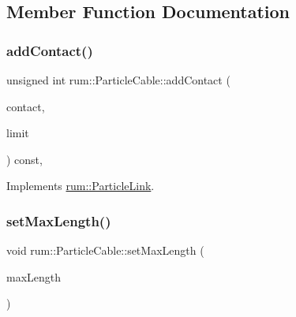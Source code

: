 \subsection{Member Function Documentation}
\mbox{\label{classrum_1_1_particle_cable_a078344be0db7ccc00d326ac767736431}} 
\subsubsection{\texorpdfstring{add\+Contact()}{addContact()}}
{\footnotesize\ttfamily unsigned int rum\+::\+Particle\+Cable\+::add\+Contact (\begin{DoxyParamCaption}\item[{\mbox{\hyperlink{classrum_1_1_particle_contact}{Particle\+Contact}} $\ast$}]{contact,  }\item[{unsigned int}]{limit }\end{DoxyParamCaption}) const\hspace{0.3cm}{\ttfamily [override]}, {\ttfamily [virtual]}}



Implements \mbox{\hyperlink{classrum_1_1_particle_link_a0da76619bd1d2ae04d5f8173c2883ff2}{rum\+::\+Particle\+Link}}.

\mbox{\label{classrum_1_1_particle_cable_a3a40cd1d2581bec38d66275af22c9347}} 
\subsubsection{\texorpdfstring{set\+Max\+Length()}{setMaxLength()}}
{\footnotesize\ttfamily void rum\+::\+Particle\+Cable\+::set\+Max\+Length (\begin{DoxyParamCaption}\item[{\mbox{\hyperlink{namespacerum_a7e8cca23573d5eaead0f138cbaa4862c}{real}}}]{max\+Length }\end{DoxyParamCaption})}

\mbox{\label{classrum_1_1_particle_cable_ab6b2076bdb4bd5ab15a695a17649ae56}} 
